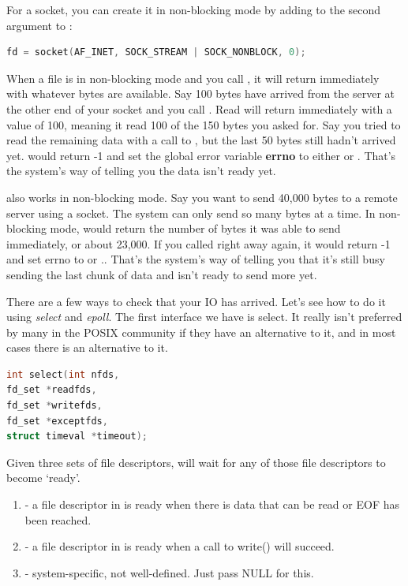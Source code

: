 For a socket, you can create it in non-blocking mode by adding  to the second argument to :

\begin{lstlisting}[language=C]
fd = socket(AF_INET, SOCK_STREAM | SOCK_NONBLOCK, 0);
\end{lstlisting}

When a file is in non-blocking mode and you call , it will return immediately with whatever bytes are available.
Say 100 bytes have arrived from the server at the other end of your socket and you call .
Read will return immediately with a value of 100, meaning it read 100 of the 150 bytes you asked for.
Say you tried to read the remaining data with a call to , but the last 50 bytes still hadn't arrived yet.
 would return -1 and set the global error variable \textbf{errno} to either  or .
That's the system's way of telling you the data isn't ready yet.

 also works in non-blocking mode.
Say you want to send 40,000 bytes to a remote server using a socket.
The system can only send so many bytes at a time.
In non-blocking mode,  would return the number of bytes it was able to send immediately, or about 23,000.
If you called  right away again, it would return -1 and set errno to  or ..
That's the system's way of telling you that it's still busy sending the last chunk of data and isn't ready to send more yet.

There are a few ways to check that your IO has arrived.
Let's see how to do it using \emph{select} and \emph{epoll}.
The first interface we have is select.
It really isn't preferred by many in the POSIX community if they have an alternative to it, and in most cases there is an alternative to it.

\begin{lstlisting}[language=C]
int select(int nfds,
fd_set *readfds,
fd_set *writefds,
fd_set *exceptfds,
struct timeval *timeout);
\end{lstlisting}

Given three sets of file descriptors,  will wait for any of those file descriptors to become `ready'.

\begin{enumerate}
\item {} - a file descriptor in  is ready when there is data that can be read or EOF has been reached.

\item {} - a file descriptor in  is ready when a call to write() will succeed.

\item {} - system-specific, not well-defined.
  Just pass NULL for this.
\end{enumerate}

